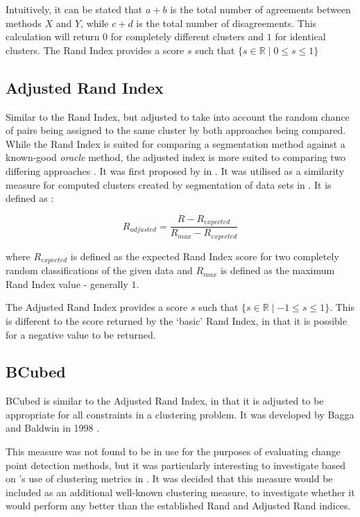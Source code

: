 \documentclass{uvamscse}	%
\begin{document}
	Intuitively, it can be stated that $a+b$ is the total number of agreements between methods $X$ and $Y$, while $c+d$ is the total number of disagreements. This calculation will return $0$ for completely different clusters and $1$ for identical clusters. The Rand Index provides a score $s$ such that $ \{s\in\mathbb{R} \mid 0\leq s \leq 1\} $
	
\subsection{Adjusted Rand Index}
	
Similar to the Rand Index, but adjusted to take into account the random chance of pairs being assigned to the same cluster by both approaches being compared. While the Rand Index is suited for comparing a segmentation method against a known-good \emph{oracle} method, the adjusted index is more suited to comparing two differing approaches \cite{Matteson2012}. It was first proposed by \citeauthor{Hubert1985} in . It was utilised as a similarity measure for computed clusters created by segmentation of data sets in \cite{Matteson2012}. It is defined as \cite{Hubert1985}:
	
	\begin{equation}
	    R_{adjusted} = \frac{R - R_{expected}}{R_{max} - R_{expected}}
	\end{equation}
	
	where $R_{expected}$ is defined as the expected Rand Index score for two completely random classifications of the given data \cite{Matteson2012} and $R_{max}$ is defined as the maximum Rand Index value - generally $1$.
	
	The Adjusted Rand Index provides a score $s$ such that $ \{s\in\mathbb{R} \mid -1\leq s \leq 1\} $. This is different to the score returned by the `basic' Rand Index, in that it is possible for a negative value to be returned.
		
\subsection{BCubed}
		
BCubed is similar to the Adjusted Rand Index, in that it is adjusted to be appropriate for all constraints in a clustering problem. It was developed by Bagga and Baldwin in 1998 \cite{Bagga1998}.

This measure was not found to be in use for the purposes of evaluating change point detection methods, but it was particularly interesting to investigate based on \citeauthor{Matteson2012}'s use of clustering metrics in \cite{Matteson2012}. It was decided that this measure would be included as an additional well-known clustering measure, to investigate whether it would perform any better than the established Rand and Adjusted Rand indices.
	
\end{document}
